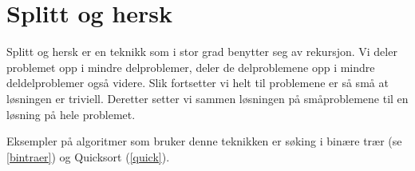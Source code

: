 \section{Splitt og hersk} \label{splitthersk}
Splitt og hersk er en teknikk som i stor grad benytter seg av rekursjon. Vi deler problemet opp i mindre delproblemer, deler de delproblemene opp i mindre deldelproblemer også videre. Slik fortsetter vi helt til problemene er så små at løsningen er triviell. Deretter setter vi sammen løsningen på småproblemene til en løsning på hele problemet. 

Eksempler på algoritmer som bruker denne teknikken er søking i binære trær (se \ref{bintraer}) og Quicksort (\ref{quick}).
